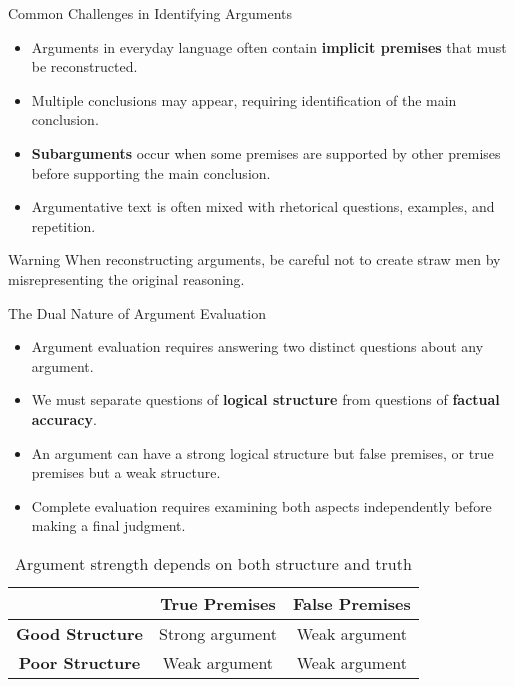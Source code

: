 \documentclass{beamer}
\begin{document}
\begin{frame}{Common Challenges in Identifying Arguments}
    \begin{itemize}
        \item Arguments in everyday language often contain \textbf{implicit premises} that must be reconstructed.
        \item Multiple conclusions may appear, requiring identification of the main conclusion.
        \item \textbf{Subarguments} occur when some premises are supported by other premises before supporting the main conclusion.
        \item Argumentative text is often mixed with rhetorical questions, examples, and repetition.
    \end{itemize}
    
    \begin{alertblock}{Warning}
        When reconstructing arguments, be careful not to create straw men by misrepresenting the original reasoning.
    \end{alertblock}
\end{frame}

\begin{frame}{The Dual Nature of Argument Evaluation}
    \begin{itemize}
        \item Argument evaluation requires answering two distinct questions about any argument.
        \item We must separate questions of \textbf{logical structure} from questions of \textbf{factual accuracy}.
        \item An argument can have a strong logical structure but false premises, or true premises but a weak structure.
        \item Complete evaluation requires examining both aspects independently before making a final judgment.
    \end{itemize}
    
    \begin{table}
        \centering
        \begin{tabular}{|c|c|c|}
            \hline
            & \textbf{True Premises} & \textbf{False Premises} \\
            \hline
            \textbf{Good Structure} & Strong argument & Weak argument \\
            \hline
            \textbf{Poor Structure} & Weak argument & Weak argument \\
            \hline
        \end{tabular}
        \caption{Argument strength depends on both structure and truth}
    \end{table}
\end{frame}
\end{document}
